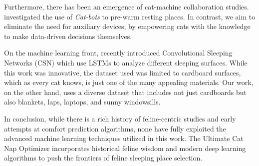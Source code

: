 Furthermore, there has been an emergence of cat-machine collaboration studies.
\citet{mittens2021catbots} investigated the use of \emph{Cat-bots} to pre-warm resting places.
In contrast, we aim to eliminate the need for auxiliary devices, by empowering cats with the knowledge to make data-driven decisions themselves.

On the machine learning front, \citet{purrsington2023csn} recently introduced Convolutional Sleeping Networks (CSN) which use LSTMs \citep{hochreiter97} to analyze different sleeping surfaces.
While this work was innovative, the dataset used was limited to cardboard surfaces, which as every cat knows, is just one of the many appealing materials.
Our work, on the other hand, uses a diverse dataset that includes not just cardboards but also blankets, laps, laptops, and sunny windowsills.

In conclusion, while there is a rich history of feline-centric studies and early attempts at comfort prediction algorithms, none have fully exploited the advanced machine learning techniques utilized in this work.
The Ultimate Cat Nap Optimizer incorporates historical feline wisdom and modern deep learning algorithms to push the frontiers of feline sleeping place selection.
